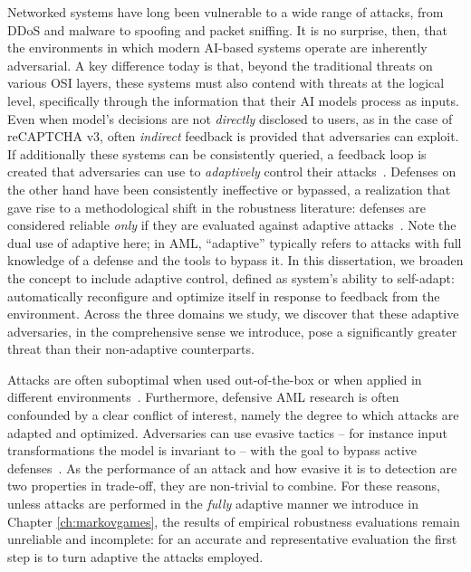 Networked systems have long been vulnerable to a wide range of attacks, from DDoS and malware to spoofing and packet sniffing. It is no surprise, then, that the environments in which modern AI-based systems operate are inherently adversarial. 
A key difference today is that, beyond the traditional threats on various \gls{OSI} layers, these systems must also contend with threats at the logical level, specifically through the information that their AI models process as inputs.
Even when model's decisions are not \textit{directly} disclosed to users, as in the case of reCAPTCHA v3, often \textit{indirect} feedback is provided that adversaries can exploit.
If additionally these systems can be consistently queried, a feedback loop is created that adversaries can use to \textit{adaptively} control their attacks~\cite{astrom1995adaptive}.
Defenses on the other hand have been consistently ineffective or bypassed, a realization that gave rise to a methodological shift in the robustness literature: defenses are considered reliable \textit{only} if they are evaluated against adaptive attacks~\cite{madry2017towards}.
Note the dual use of adaptive here; in \gls{AML}, “adaptive” typically refers to attacks with full knowledge of a defense and the tools to bypass it. 
In this dissertation, we broaden the concept to include adaptive control, defined as system's ability to self-adapt: automatically reconfigure and optimize itself in response to feedback from the environment.
Across the three domains we study, we discover that these adaptive adversaries, in the comprehensive sense we introduce, pose a significantly greater threat than their non-adaptive counterparts.

Attacks are often suboptimal when used out-of-the-box or when applied in different environments~\cite{croce2020reliable}.
Furthermore, defensive \gls{AML} research is often confounded by a clear conflict of interest, namely the degree to which attacks are adapted and optimized.
Adversaries can use evasive tactics -- for instance input transformations the model is invariant to -- with the goal to bypass active defenses~\cite{chen2020stateful,li2022blacklight}.
As the performance of an attack and how evasive it is to detection are two properties in trade-off, they are non-trivial to combine.
For these reasons, unless attacks are performed in the \textit{fully} adaptive manner we introduce in Chapter \ref{ch:markovgames}, the results of empirical robustness evaluations remain unreliable and incomplete: for an accurate and representative evaluation the first step is to turn adaptive the attacks employed.

